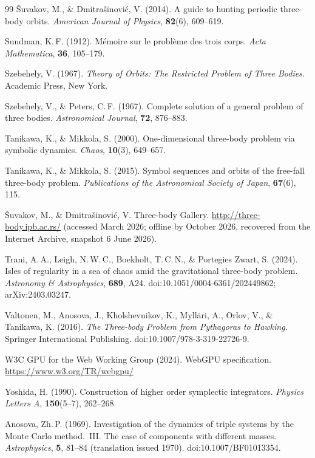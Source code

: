 \documentclass[11pt,a4paper]{article}
\begin{document}
\begin{thebibliography}{99}
{\v{S}}uvakov, M., \& Dmitra{\v{s}}inovi{\'c}, V. (2014).
A guide to hunting periodic three-body orbits.
\textit{American Journal of Physics}, \textbf{82}(6), 609--619.

Sundman, K.\,F. (1912).
M\'{e}moire sur le probl\`{e}me des trois corps.
\textit{Acta Mathematica}, \textbf{36}, 105--179.

Szebehely, V. (1967).
\textit{Theory of Orbits: The Restricted Problem of Three Bodies}.
Academic Press, New York.

Szebehely, V., \& Peters, C.\,F. (1967).
Complete solution of a general problem of three bodies.
\textit{Astronomical Journal}, \textbf{72}, 876--883.

Tanikawa, K., \& Mikkola, S. (2000).
One-dimensional three-body problem via symbolic dynamics.
\textit{Chaos}, \textbf{10}(3), 649--657.

Tanikawa, K., \& Mikkola, S. (2015).
Symbol sequences and orbits of the free-fall three-body problem.
\textit{Publications of the Astronomical Society of Japan}, \textbf{67}(6), 115.

{\v{S}}uvakov, M., \& Dmitra{\v{s}}inovi{\'c}, V.
Three-body Gallery.
\url{http://three-body.ipb.ac.rs/} (accessed March 2026; offline by October 2026, recovered from the
Internet Archive, snapshot 6 June 2026).

Trani, A.\,A., Leigh, N.\,W.\,C., Boekholt, T.\,C.\,N., \& Portegies Zwart, S. (2024).
Isles of regularity in a sea of chaos amid the gravitational three-body problem.
\textit{Astronomy \& Astrophysics}, \textbf{689}, A24.
doi:10.1051/0004-6361/202449862; arXiv:2403.03247.

Valtonen, M., Anosova, J., Kholshevnikov, K., Myll\"{a}ri, A., Orlov, V., \& Tanikawa, K. (2016).
\textit{The Three-body Problem from Pythagoras to Hawking}.
Springer International Publishing.
doi:10.1007/978-3-319-22726-9.

W3C GPU for the Web Working Group (2024).
WebGPU specification.
\url{https://www.w3.org/TR/webgpu/}

Yoshida, H. (1990).
Construction of higher order symplectic integrators.
\textit{Physics Letters A}, \textbf{150}(5--7), 262--268.

Anosova, Zh.\,P. (1969).
Investigation of the dynamics of triple systems by the Monte Carlo method.\ III. The case of components with different masses.
\textit{Astrophysics}, \textbf{5}, 81--84 (translation issued 1970).
doi:10.1007/BF01013354.


\end{thebibliography}
\end{document}
